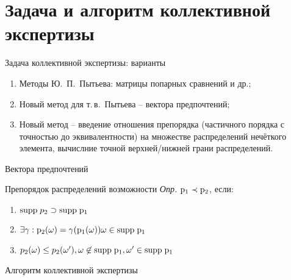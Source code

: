 \section{Задача и алгоритм коллективной экспертизы}

\begin{frame}{Задача коллективной экспертизы: варианты}
	\begin{enumerate}
		\item Методы Ю.~П.~Пытьева: матрицы попарных сравнений и др.;
		\item Новый метод для т.\,в.~Пытьева -- вектора предпочтений;
		\item Новый метод -- введение отношения препорядка (частичного порядка с точностью до эквивалентности) на множестве распределений нечёткого элемента, вычислние точной верхней/нижней грани распределений.
	\end{enumerate} 
\end{frame}

\begin{frame}{Вектора предпочтений}
\end{frame}

\begin{frame}{Препорядок распределений возможности}
	\emph{Опр.} ${\mathrm{p}}_1 \prec {\mathrm{p}}_2$, если:
	\begin{enumerate}
		 \item ${\mathrm{supp}}\;p_2 \supset {\mathrm{supp}} \; {\mathrm{p}}_1$

		  \item $\exists \gamma: {\mathrm{p}}_2(\omega) = \gamma({\mathrm{p}}_1(\omega))
		   \omega \in {\mathrm{supp}}\;{\mathrm{p}}_1$ 

		  \item $p_2(\omega) \leq p_2(\omega'), \omega \not\in  {\mathrm{supp}} \; {\mathrm{p}}_1, 
		  \omega' \in  {\mathrm{supp}} \; {\mathrm{p}}_1$
	\end{enumerate}
\end{frame}

\begin{frame}{Алгоритм коллективной экспертизы}
\end{frame}